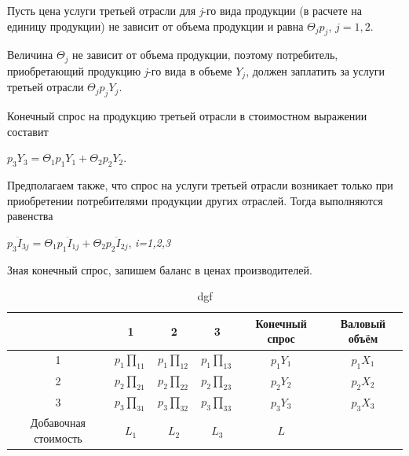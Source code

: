 \documentclass[12pt, 4paper]{book}
\begin{document}
{\par
\hspace{0.5cm} 
Пусть цена услуги третьей отрасли для \textit{j}-го вида продукции (в расчете на единицу продукции) не зависит от объема продукции и равна $ \Theta_jp_j $, $ j = 1,2 $.
\par
\hspace{0.5cm} 
Величина $ \Theta_j$ не зависит от объема продукции, поэтому потребитель, приобретающий продукцию \textit{j}-го вида в объеме $ Y_j $, должен заплатить за услуги третьей отрасли $  \Theta_jp_jY_j $.
\par
\hspace{0.5cm}
Конечный спрос на продукцию третьей отрасли в стоимостном выражении составит 
\begin{center}
	$ p_3Y_3 = \Theta_1p_1Y_1 + \Theta_2p_2Y_2 $.
\end{center}
\par
\hspace{0.5cm}
Предполагаем также, что спрос на услуги третьей отрасли возникает только при приобретении потребителями продукции других отраслей. Тогда выполняются равенства
\begin{center}
	$ p_3\ddot{I}_{3j} = \Theta_1p_1\ddot{I}_{1j} + \Theta_2p_2\ddot{I}_{2j} $, \textit{i=1,2,3}
\end{center}
\par
\hspace{0.5cm}
Зная конечный спрос, запишем баланс в ценах производителей.
\begin{table}[h]
	\caption{dgf}
	\begin{tabular}{|p{2in}|p{1in}|p{1in}|p{1in}|p{2in}|p{2in}|}
		\hline
		\multicolumn{1}{|c|}{} & \multicolumn{1}{c|}{1} & \multicolumn{1}{c|}{2} & \multicolumn{1}{c|}{3} & \multicolumn{1}{c|}{Конечный спрос} & \multicolumn{1}{c|}{Валовый объём} \\ \hline
		\multicolumn{1}{|c|}{1} & \multicolumn{1}{c|}{$ p_1\prod_{11} $} & \multicolumn{1}{c|}{$ p_1\prod_{12} $} & \multicolumn{1}{c|}{$ p_1\prod_{13} $} & \multicolumn{1}{c|}{$ p_1Y_1 $} & \multicolumn{1}{c|}{$ p_1X_1 $} \\ \hline
		\multicolumn{1}{|c|}{2} & \multicolumn{1}{c|}{$ p_2\prod_{21} $} & \multicolumn{1}{c|}{$ p_2\prod_{22} $} & \multicolumn{1}{c|}{$ p_2\prod_{23} $} & \multicolumn{1}{c|}{$ p_2Y_2 $} & \multicolumn{1}{c|}{$ p_2X_2 $} \\ \hline
		\multicolumn{1}{|c|}{3} & \multicolumn{1}{c|}{$ p_3\prod_{31} $} & \multicolumn{1}{c|}{$ p_3\prod_{32} $} & \multicolumn{1}{c|}{$ p_3\prod_{33} $} & \multicolumn{1}{c|}{$ p_3Y_3 $} & \multicolumn{1}{c|}{$ p_3X_3 $} \\ \hline
		\multicolumn{1}{|c|}{{\small Добавочная стоимость}} & \multicolumn{1}{c|}{$ L_1 $} & \multicolumn{1}{c|}{$ L_2 $} & \multicolumn{1}{c|}{$ L_3 $} & \multicolumn{1}{c|}{$ L $} & \multicolumn{1}{c|}{} \\ \hline		
	\end{tabular} 
\end{table}
\par

}
\end{document}
